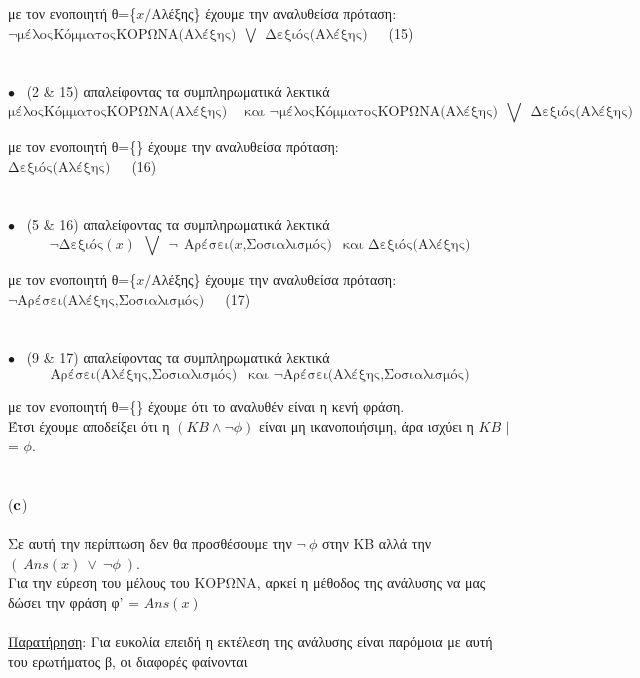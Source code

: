 \documentclass[10pt]{article}
\begin{document}
\hspace{5mm} με τον ενοποιητή θ=\{$x/$Αλέξης\} έχουμε την αναλυθείσα πρόταση: \\

\hspace{40mm} $\neg \text{μέλοςΚόμματοςΚΟΡΩΝΑ(Αλέξης)} \ \  \bigvee  \ \ \text{Δεξιός(Αλέξης)}$\ \ \  (15)
\\ \\\ \\

$\bullet$ \ (2 \&  15) απαλείφοντας τα συμπληρωματικά λεκτικά  \\
\[ \text{μέλοςΚόμματοςΚΟΡΩΝΑ(Αλέξης)} \ \ \ \ \text{ και \ \ \ \ }  \neg \text{μέλοςΚόμματοςΚΟΡΩΝΑ(Αλέξης)} \ \  \bigvee  \ \ \text{Δεξιός(Αλέξης)} \] 

\hspace{5mm} με τον ενοποιητή θ=\{\} έχουμε την αναλυθείσα πρόταση: \\

\hspace{40mm} $\text{Δεξιός(Αλέξης)}$\ \ \  (16)
\\ \\\ \\

$\bullet$ \ (5 \&  16) απαλείφοντας τα συμπληρωματικά λεκτικά  \\
\[ \neg \text{Δεξιός}(x) \ \ \bigvee \ \ \neg \ \ \text{Αρέσει($x$,Σοσιαλισμός)} \ \ \text{ και \ \ \ \ }  \text{Δεξιός(Αλέξης)}  \] 

\hspace{5mm} με τον ενοποιητή θ=\{$x/$Αλέξης\} έχουμε την αναλυθείσα πρόταση: \\

\hspace{40mm} $\neg \text{Αρέσει(Αλέξης,Σοσιαλισμός)}$\ \ \  (17)
\\ \\\ \\

$\bullet$ \ (9 \&  17) απαλείφοντας τα συμπληρωματικά λεκτικά  \\
\[ \text{Αρέσει(Αλέξης,Σοσιαλισμός)} \ \ \text{ και \ \ \ \ }  \neg \text{Αρέσει(Αλέξης,Σοσιαλισμός)}  \] 

\hspace{5mm} με τον ενοποιητή θ=\{\} έχουμε ότι το αναλυθέν είναι η κενή φράση.\\

Έτσι έχουμε αποδείξει ότι η $( KB \wedge \neg \phi) $ είναι μη ικανοποιήσιμη, άρα ισχύει  η $KB$ $|$= $\phi$. \\ \\  \\
($\bf c$) \normalfont \\ \\
Σε αυτή την περίπτωση δεν θα προσθέσουμε την $\neg \ \phi$ στην ΚΒ αλλά την $( \ Ans(x) \ \vee \ \neg \phi \ )$.\\
Για την εύρεση του μέλους του ΚΟΡΩΝΑ, αρκεί η μέθοδος της ανάλυσης να μας δώσει την φράση φ' = $Ans(x)$ \\ \\
\underline{Παρατήρηση}: Για ευκολία επειδή η εκτέλεση της ανάλυσης είναι παρόμοια με αυτή του ερωτήματος β, οι διαφορές φαίνονται 
\end{document}
